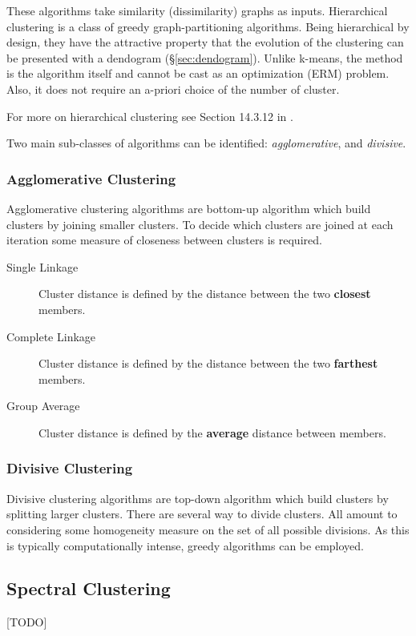 These algorithms take similarity (dissimilarity) graphs as inputs.
Hierarchical clustering is a class of greedy graph-partitioning algorithms. 
Being hierarchical by design, they have the attractive property that the evolution of the clustering can be presented with a dendogram (\S\ref{sec:dendogram}).  
Unlike k-means, the method is the algorithm itself and cannot be cast as an optimization (ERM) problem.
Also, it does not require an a-priori choice of the number of cluster.

For more on hierarchical clustering see Section 14.3.12 in \cite{hastie_elements_2003}.

Two main sub-classes of algorithms can be identified: \emph{agglomerative}, and \emph{divisive}.
\subsubsection{Agglomerative Clustering}
Agglomerative clustering algorithms are bottom-up algorithm which build clusters by joining smaller clusters. 
To decide which clusters are joined at each iteration some measure of closeness between clusters is required. 
\begin{description}
\item[Single Linkage] Cluster distance is defined by the distance between the two \textbf{closest} members.
\item[Complete Linkage] Cluster distance is defined by the distance between the two \textbf{farthest} members.
\item[Group Average] Cluster distance is defined by the \textbf{average} distance between members.
\end{description}


\subsubsection{Divisive Clustering}
Divisive clustering algorithms are top-down algorithm which build clusters by splitting larger clusters. 
There are several way to divide clusters. All amount to considering some homogeneity measure on the set of all possible divisions. As this is typically computationally intense, greedy algorithms can be employed.









\subsection{Spectral Clustering}
\label{sec:spectral_clustering}
[TODO]





